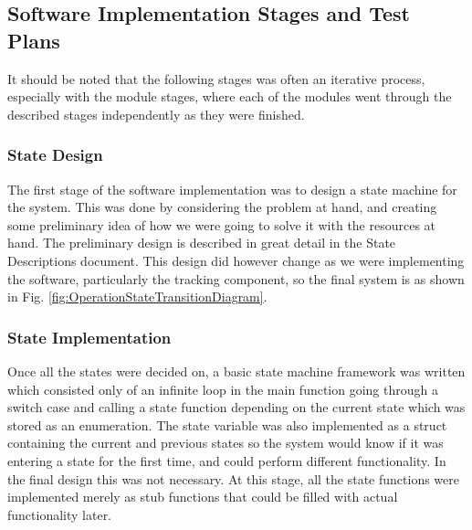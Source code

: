 \documentclass[]{report}
\begin{document}
\subsection{Software Implementation Stages and Test Plans}
It should be noted that the following stages was often an iterative process, especially with the module stages, where each of the modules went through the described stages independently as they were finished.

\subsubsection{State Design}
The first stage of the software implementation was to design a state machine for the system. This was done by considering the problem at hand, and creating some preliminary idea of how we were going to solve it with the resources at hand. \newline
The preliminary design is described in great detail in the State Descriptions document. This design did however change as we were implementing the software, particularly the tracking component, so the final system is as shown in Fig. \ref{fig:OperationStateTransitionDiagram}.

\subsubsection{State Implementation}
Once all the states were decided on, a basic state machine framework was written which consisted only of an infinite loop in the main function going through a switch case and calling a state function depending on the current state which was stored as an enumeration. The state variable was also implemented as a struct containing the current and previous states so the system would know if it was entering a state for the first time, and could perform different functionality. In the final design this was not necessary. \newline
At this stage, all the state functions were implemented merely as stub functions that could be filled with actual functionality later.
\end{document}

